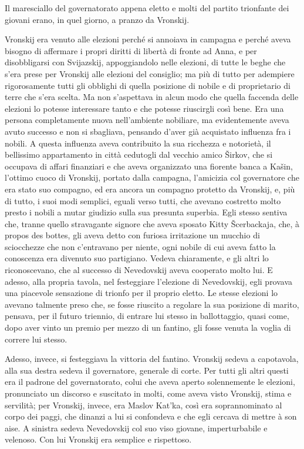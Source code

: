 \label{xxxi-4} 

Il maresciallo del governatorato appena eletto e molti del partito trionfante dei giovani erano, in quel giorno, a pranzo da Vronskij. 

Vronskij era venuto alle elezioni perché si annoiava in campagna e perché aveva bisogno di affermare i propri diritti di libertà di fronte ad Anna, e per disobbligarsi con Svijazskij, appoggiandolo nelle elezioni, di tutte le beghe che s'era prese per Vronskij alle elezioni del consiglio; ma più di tutto per adempiere rigorosamente tutti gli obblighi di quella posizione di nobile e di proprietario di terre che s'era scelta. Ma non s'aspettava in alcun modo che quella faccenda delle elezioni lo potesse interessare tanto e che potesse riuscirgli così bene. Era una persona completamente nuova nell'ambiente nobiliare, ma evidentemente aveva avuto successo e non si sbagliava, pensando d'aver già acquistato influenza fra i nobili. A questa influenza aveva contribuito la sua ricchezza e notorietà, il bellissimo appartamento in città cedutogli dal vecchio amico Širkov, che si occupava di affari finanziari e che aveva organizzato una fiorente banca a Kašin, l'ottimo cuoco di Vronskij, portato dalla campagna, l'amicizia col governatore che era stato suo compagno, ed era ancora un compagno protetto da Vronskij, e, più di tutto, i suoi modi semplici, eguali verso tutti, che avevano costretto molto presto i nobili a mutar giudizio sulla sua presunta superbia. Egli stesso sentiva che, tranne quello stravagante signore che aveva sposato Kitty Šcerbackaja, che, à propos des bottes, gli aveva detto con furiosa irritazione un mucchio di sciocchezze che non c'entravano per niente, ogni nobile di cui aveva fatto la conoscenza era divenuto suo partigiano. Vedeva chiaramente, e gli altri lo riconoscevano, che al successo di Nevedovskij aveva cooperato molto lui. E adesso, alla propria tavola, nel festeggiare l'elezione di Nevedovskij, egli provava una piacevole sensazione di trionfo per il proprio eletto. Le stesse elezioni lo avevano talmente preso che, se fosse riuscito a regolare la sua posizione di marito, pensava, per il futuro triennio, di entrare lui stesso in ballottaggio, quasi come, dopo aver vinto un premio per mezzo di un fantino, gli fosse venuta la voglia di correre lui stesso. 

Adesso, invece, si festeggiava la vittoria del fantino. Vronskij sedeva a capotavola, alla sua destra sedeva il governatore, generale di corte. Per tutti gli altri questi era il padrone del governatorato, colui che aveva aperto solennemente le elezioni, pronunciato un discorso e suscitato in molti, come aveva visto Vronskij, stima e servilità; per Vronskij, invece, era Maslov Kat'ka, così era soprannominato al corpo dei paggi, che dinanzi a lui si confondeva e che egli cercava di mettre à son aise. A sinistra sedeva Nevedovskij col suo viso giovane, imperturbabile e velenoso. Con lui Vronskij era semplice e rispettoso. 

